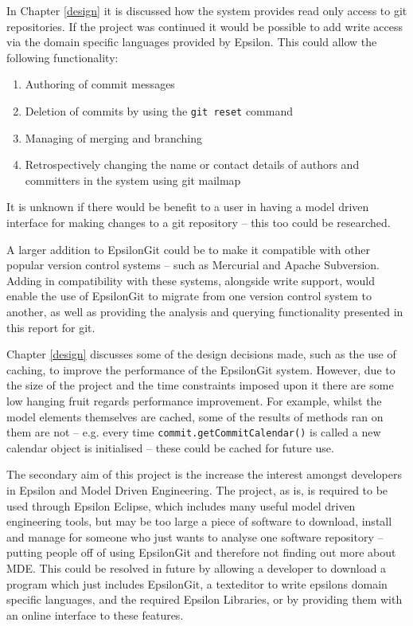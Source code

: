 \documentclass[11pt]{book}
\newcommand{\code}[1]{\texttt{#1}}
\begin{document}
In Chapter \ref{design} it is discussed how the system provides read only access to git repositories. If the project was continued it would be possible to add write access via the domain specific languages provided by Epsilon. This could allow the following functionality:

\begin{enumerate}
	\item Authoring of commit messages
	\item Deletion of commits by using the \code{git reset} command \cite{gitreset}
	\item Managing of merging and branching
	\item Retrospectively changing the name or contact details of authors and committers in the system using git mailmap \cite{gitmailmap}
\end{enumerate} 

It is unknown if there would be benefit to a user in having a model driven interface for making changes to a git repository -- this too could be researched. 

A larger addition to EpsilonGit could be to make it compatible with other popular version control systems -- such as Mercurial and Apache Subversion. Adding in compatibility with these systems, alongside write support, would enable the use of EpsilonGit to migrate from one version control system to another, as well as providing the analysis and querying functionality presented in this report for git.

Chapter \ref{design} discusses some of the design decisions made, such as the use of caching, to improve the performance of the EpsilonGit system. However, due to the size of the project and the time constraints imposed upon it there are some low hanging fruit regards performance improvement. For example, whilst the model elements themselves are cached, some of the results of methods ran on them are not -- e.g. every time \code{commit.getCommitCalendar()} is called a new calendar object is initialised -- these could be cached for future use.

The secondary aim of this project is the increase the interest amongst developers in Epsilon and Model Driven Engineering. The project, as is, is required to be used through Epsilon Eclipse, which includes many useful model driven engineering tools, but may be too large a piece of software to download, install and manage for someone who just wants to analyse one software repository -- putting people off of using EpsilonGit and therefore not finding out more about MDE. This could be resolved in future by allowing a developer to download a program which just includes EpsilonGit, a texteditor to write epsilons domain specific languages, and the required Epsilon Libraries, or by providing them with an online interface to these features.
\end{document}
